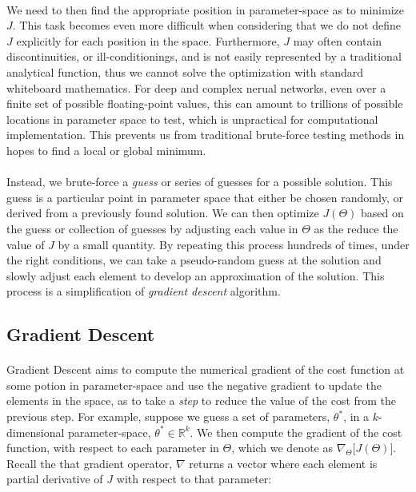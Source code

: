 \documentclass[12pt,letterpaper]{article}
\begin{document}
\paragraph*{}We need to then find the appropriate position in parameter-space as to minimize $J$. This task becomes even more difficult when considering that we do not define $J$ explicitly for each position in the space. Furthermore, $J$ may often contain discontinuities, or ill-conditionings, and is not easily represented by a traditional analytical function, thus we cannot solve the optimization with standard whiteboard mathematics. For deep and complex nerual networks, even over a finite set of possible floating-point values, this can amount to trillions of possible locations in parameter space to test, which is unpractical for computational implementation. This prevents us from traditional brute-force testing methods in hopes to find a local or global minimum. 

\paragraph*{}Instead, we brute-force a \textit{guess} or series of guesses for a possible solution. This guess is a particular point in parameter space that either be chosen randomly, or derived from a previously found solution. We can then optimize $J(\Theta)$ based on the guess or collection of guesses by adjusting each value in $\Theta$ as the reduce the value of $J$ by a small quantity. By repeating this process hundreds of times, under the right conditions, we can take a pseudo-random guess at the solution and slowly adjust each element to develop an approximation of the solution. This process is a simplification of \textit{gradient descent} algorithm.

\subsection{Gradient Descent}

\paragraph*{}Gradient Descent aims to compute the numerical gradient of the cost function at some potion in parameter-space and use the negative gradient to update the elements in the space, as to take a \textit{step} to reduce the value of the cost from the previous step. For example, suppose we guess a set of parameters, $\theta^*$, in a $k$-dimensional parameter-space, $\theta^* \in \mathbb{R}^k$. We then compute the gradient of the cost function, with respect to each parameter in $\Theta$, which we denote as $\nabla_\Theta \big[ J(\Theta) \big]$. Recall the that gradient operator, $\nabla$ returns a vector where each element is partial derivative of $J$ with respect to that parameter:
\end{document}
